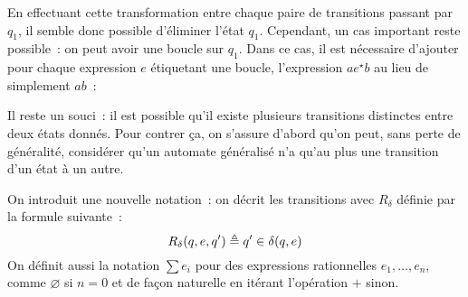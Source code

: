 \begin{figure}[h]
  \centering
\end{figure}

En effectuant cette transformation entre chaque paire de transitions passant par
$q_1$, il semble donc possible d'éliminer l'état $q_1$. Cependant, un cas
important reste possible~: on peut avoir une boucle sur $q_1$. Dans ce cas, il
est nécessaire d'ajouter pour chaque expression $e$ étiquetant une boucle,
l'expression $ae^\star b$ au lieu de simplement $ab$~:

\begin{figure}[h]
  \centering
\end{figure}

Il reste un souci~: il est possible qu'il existe plusieurs transitions
distinctes entre deux états donnés. Pour contrer ça, on s'assure d'abord qu'on
peut, sans perte de généralité, considérer qu'un automate généralisé n'a qu'au
plus une transition d'un état à un autre.

On introduit une nouvelle notation~: on décrit les transitions avec $R_\delta$
définie par la formule suivante~:
\[R_\delta(q,e,q') \triangleq q' \in \delta(q,e)\]
On définit aussi la notation $\sum e_i$ pour des expressions rationnelles
$e_1,\ldots,e_n$, comme $\varnothing$ si $n = 0$ et de façon naturelle en
itérant l'opération $+$ sinon.

